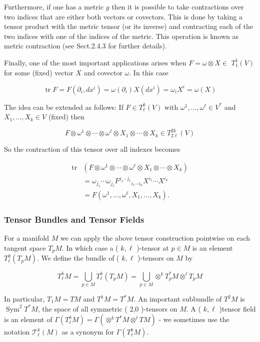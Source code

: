 \documentclass[10pt, letterpaper]{article}
\begin{document}
Furthermore, if one has a metric $g$ then it is possible to take contractions over two indices that are either both vectors or covectors. This is done by taking a tensor product with the metric tensor (or its inverse) and contracting each of the two indices with one of the indices of the metric. This operation is known as metric contraction (see Sect.2.4.3 for further details).

Finally, one of the most important applications arises when $F=\omega \otimes X \in$ $T_{1}^{1}(V)$ for some (fixed) vector $X$ and covector $\omega$. In this case

$$
\operatorname{tr} F=F\left(\partial_{i}, d x^{i}\right)=\omega\left(\partial_{i}\right) X\left(d x^{i}\right)=\omega_{i} X^{i}=\omega(X)
$$

The idea can be extended as follows: If $F \in T_{\ell}^{k}(V)$ with $\omega^{1}, \ldots, \omega^{\ell} \in V^{*}$ and $X_{1}, \ldots, X_{k} \in V$ (fixed) then

$$
F \otimes \omega^{1} \otimes \cdots \otimes \omega^{\ell} \otimes X_{1} \otimes \cdots \otimes X_{k} \in T_{2 \ell}^{2 k}(V)
$$

So the contraction of this tensor over all indexes becomes

$$
\begin{aligned}
\operatorname{tr} & \left(F \otimes \omega^{1} \otimes \cdots \otimes \omega^{\ell} \otimes X_{1} \otimes \cdots \otimes X_{k}\right) \\
& =\omega_{j_{1}} \cdots \omega_{j_{\ell}} F^{j_{1} \cdots j_{\ell}}{ }_{i_{1} \cdots i_{k}} X^{i_{1}} \cdots X^{i_{k}} \\
& =F\left(\omega^{1}, \ldots, \omega^{\ell}, X_{1}, \ldots, X_{k}\right) .
\end{aligned}
$$

\subsubsection*{Tensor Bundles and Tensor Fields}
For a manifold $M$ we can apply the above tensor construction pointwise on each tangent space $T_{p} M$. In which case a ( $k, \ell$ )-tensor at $p \in M$ is an element $T_{\ell}^{k}\left(T_{p} M\right)$. We define the bundle of ( $k, \ell$ )-tensors on $M$ by

$$
T_{\ell}^{k} M=\bigcup_{p \in M} T_{\ell}^{k}\left(T_{p} M\right)=\bigcup_{p \in M} \otimes^{k} T_{p}^{*} M \otimes^{\ell} T_{p} M
$$

In particular, $T_{1} M=T M$ and $T^{1} M=T^{*} M$. An important subbundle of $T^{2} M$ is $\operatorname{Sym}^{2} T^{*} M$, the space of all symmetric ( 2,0 )-tensors on $M$. A ( $k, \ell$ )tensor field is an element of $\Gamma\left(T_{\ell}^{k} M\right)=\Gamma\left(\otimes^{k} T^{*} M \otimes^{\ell} T M\right)$ - we sometimes use the notation $\mathscr{T}_{\ell}^{k}(M)$ as a synonym for $\Gamma\left(T_{\ell}^{k} M\right)$.
\end{document}
